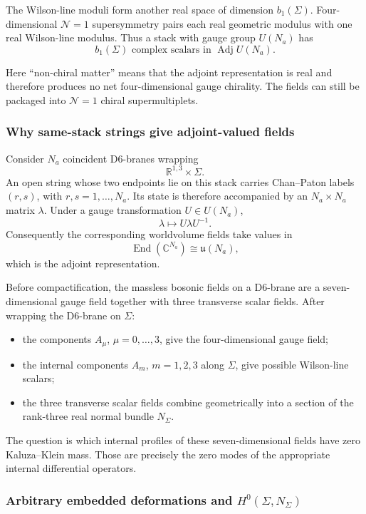 \documentclass[
  10pt,
  a4paper,
  openany]{book}
\providecommand{\tightlist}{%
  \setlength{\itemsep}{0pt}\setlength{\parskip}{0pt}}
\begin{document}
The Wilson-line moduli form another real space of dimension
\(b_1(\Sigma)\). Four-dimensional \(\mathcal N=1\) supersymmetry pairs
each real geometric modulus with one real Wilson-line modulus. Thus a
stack with gauge group \(U(N_a)\) has \[
\boxed{b_1(\Sigma)\text{ complex scalars in }\operatorname{Adj}U(N_a)}.
\]

Here ``non-chiral matter'' means that the adjoint representation is real
and therefore produces no net four-dimensional gauge chirality. The
fields can still be packaged into \(\mathcal N=1\) chiral
supermultiplets.

\subsubsection{Why same-stack strings give adjoint-valued
fields}\label{why-same-stack-strings-give-adjoint-valued-fields}

Consider \(N_a\) coincident D6-branes wrapping \[
\mathbb R^{1,3}\times\Sigma.
\] An open string whose two endpoints lie on this stack carries
Chan--Paton labels \((r,s)\), with \(r,s=1,\ldots,N_a\). Its state is
therefore accompanied by an \(N_a\times N_a\) matrix \(\lambda\). Under
a gauge transformation \(U\in U(N_a)\), \[
\lambda\longmapsto U\lambda U^{-1}.
\] Consequently the corresponding worldvolume fields take values in \[
\operatorname{End}(\mathbb C^{N_a})\cong\mathfrak u(N_a),
\] which is the adjoint representation.

Before compactification, the massless bosonic fields on a D6-brane are a
seven-dimensional gauge field together with three transverse scalar
fields. After wrapping the D6-brane on \(\Sigma\):

\begin{itemize}
\tightlist
\item
  the components \(A_\mu\), \(\mu=0,\ldots,3\), give the
  four-dimensional gauge field;
\item
  the internal components \(A_m\), \(m=1,2,3\) along \(\Sigma\), give
  possible Wilson-line scalars;
\item
  the three transverse scalar fields combine geometrically into a
  section of the rank-three real normal bundle \(N_\Sigma\).
\end{itemize}

The question is which internal profiles of these seven-dimensional
fields have zero Kaluza--Klein mass. Those are precisely the zero modes
of the appropriate internal differential operators.

\subsubsection{\texorpdfstring{Arbitrary embedded deformations and
\(H^0(\Sigma,N_\Sigma)\)}{Arbitrary embedded deformations and H\^{}0(\textbackslash Sigma,N\_\textbackslash Sigma)}}\label{arbitrary-embedded-deformations-and-h0sigman_sigma}
\end{document}
